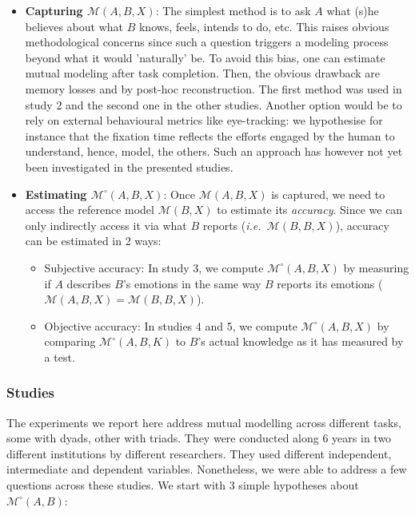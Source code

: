 \documentclass[twocolumn]{article}
\newcommand{\ie}{{\textit{i.e.\ }}}
\newcommand{\M}[3]{{\mathcal{M}(#1, #2, #3)}}
\newcommand{\model}[3]{{$\mathcal{M}(#1, #2, #3)$}}
\newcommand{\refmodel}[2]{{$\mathcal{M}(#1, #2)$}}
\newcommand{\Model}[3]{{$\mathcal{M}^{\circ}(#1, #2, #3)$}}
\begin{document}
\begin{itemize}
    \item {\bf Capturing \model{A}{B}{X}}: The simplest method is to ask $A$ what (s)he
        believes about what $B$ knows, feels, intends to do, etc. This raises
        obvious methodological concerns since such a question triggers a
        modeling process beyond what it would 'naturally' be. To avoid this
        bias, one can estimate mutual modeling after task completion. Then, the
        obvious drawback are memory losses and by post-hoc reconstruction.
        The first method was used in study 2 and the
        second one in the other studies. Another option would be to rely on external behavioural metrics like
        eye-tracking: we hypothesise for instance that the fixation time
        reflects the efforts engaged by the human to understand, hence, model,
        the others. Such an approach has however not yet been investigated in the presented studies.

    \item {\bf Estimating \Model{A}{B}{X}}: Once \model{A}{B}{X} is captured, we
        need to access the reference model \refmodel{B}{X} to estimate its
        \emph{accuracy}. Since we can only indirectly access it via what $B$
        reports (\ie \model{B}{B}{X}), accuracy can be estimated in 2 ways:

        \begin{itemize}

            \item Subjective accuracy: In study 3, we compute
                \Model{A}{B}{X} by measuring if $A$ describes
                $B$'s emotions in the same way $B$ reports its emotions 
                ($\M{A}{B}{X} = \M{B}{B}{X}$).

            \item Objective accuracy: In studies 4 and 5, we compute
                \Model{A}{B}{X} by comparing \Model{A}{B}{K} to $B$'s
                actual knowledge as it has measured by a test.

        \end{itemize}

\end{itemize}


\subsubsection*{Studies}

The experiments we report here address mutual modelling across different tasks, some with
dyads, other with triads. They were conducted along 6 years in two different
institutions by different researchers. They used different independent,
intermediate and dependent variables. Nonetheless, we were able to address a few
questions across these studies. We start with 3 simple hypotheses about
$\mathcal{M}^{\circ}(A,B)$:
\end{document}
